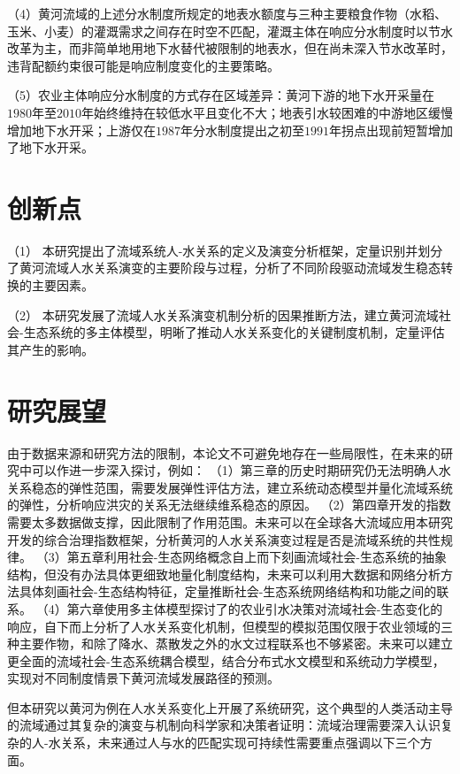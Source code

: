 （4）黄河流域的上述分水制度所规定的地表水额度与三种主要粮食作物（水稻、玉米、小麦）的灌溉需求之间存在时空不匹配，灌溉主体在响应分水制度时以节水改革为主，而非简单地用地下水替代被限制的地表水，但在尚未深入节水改革时，违背配额约束很可能是响应制度变化的主要策略。

（5）农业主体响应分水制度的方式存在区域差异：黄河下游的地下水开采量在$1980$年至$2010$年始终维持在较低水平且变化不大；地表引水较困难的中游地区缓慢增加地下水开采；上游仅在$1987$年分水制度提出之初至$1991$年拐点出现前短暂增加了地下水开采。

\section{创新点}

（1） 本研究提出了流域系统人-水关系的定义及演变分析框架，定量识别并划分了黄河流域人水关系演变的主要阶段与过程，分析了不同阶段驱动流域发生稳态转换的主要因素。

（2） 本研究发展了流域人水关系演变机制分析的因果推断方法，建立黄河流域社会-生态系统的多主体模型，明晰了推动人水关系变化的关键制度机制，定量评估其产生的影响。

\section{研究展望}

由于数据来源和研究方法的限制，本论文不可避免地存在一些局限性，在未来的研究中可以作进一步深入探讨，例如：
（1）第三章的历史时期研究仍无法明确人水关系稳态的弹性范围，需要发展弹性评估方法，建立系统动态模型并量化流域系统的弹性，分析响应洪灾的关系无法继续维系稳态的原因。
（2）第四章开发的指数需要太多数据做支撑，因此限制了作用范围。未来可以在全球各大流域应用本研究开发的综合治理指数框架，分析黄河的人水关系演变过程是否是流域系统的共性规律。
（3）第五章利用社会-生态网络概念自上而下刻画流域社会-生态系统的抽象结构，但没有办法具体更细致地量化制度结构，未来可以利用大数据和网络分析方法具体刻画社会-生态结构特征，定量推断社会-生态系统网络结构和功能之间的联系。
（4）第六章使用多主体模型探讨了的农业引水决策对流域社会-生态变化的响应，自下而上分析了人水关系变化机制，但模型的模拟范围仅限于农业领域的三种主要作物，和除了降水、蒸散发之外的水文过程联系也不够紧密。未来可以建立更全面的流域社会-生态系统耦合模型，结合分布式水文模型和系统动力学模型，实现对不同制度情景下黄河流域发展路径的预测。

但本研究以黄河为例在人水关系变化上开展了系统研究，这个典型的人类活动主导的流域通过其复杂的演变与机制向科学家和决策者证明：流域治理需要深入认识复杂的人-水关系，未来通过人与水的匹配实现可持续性需要重点强调以下三个方面。

